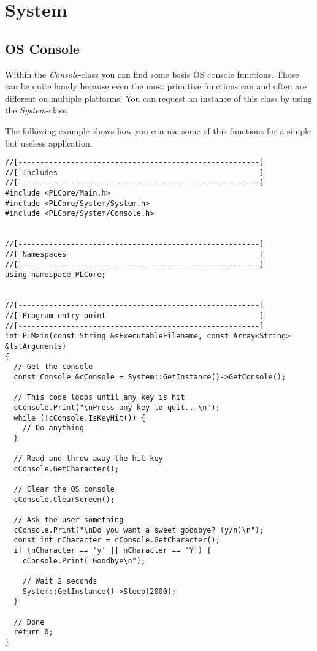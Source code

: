 \section{System}




\subsection{OS Console}
Within the \emph{Console}-class you can find some basis OS console functions. Those can be quite handy because even the most primitive functions can and often are different on multiple platforms! You can request an instance of this class by using the \emph{System}-class.

The following example shows how you can use some of this functions for a simple but useless application:

\begin{lstlisting}[caption=OS console usage example]
//[-------------------------------------------------------]
//[ Includes                                              ]
//[-------------------------------------------------------]
#include <PLCore/Main.h>
#include <PLCore/System/System.h>
#include <PLCore/System/Console.h>


//[-------------------------------------------------------]
//[ Namespaces                                            ]
//[-------------------------------------------------------]
using namespace PLCore;


//[-------------------------------------------------------]
//[ Program entry point                                   ]
//[-------------------------------------------------------]
int PLMain(const String &sExecutableFilename, const Array<String> &lstArguments)
{
  // Get the console
  const Console &cConsole = System::GetInstance()->GetConsole();

  // This code loops until any key is hit
  cConsole.Print("\nPress any key to quit...\n");
  while (!cConsole.IsKeyHit()) {
    // Do anything
  }

  // Read and throw away the hit key
  cConsole.GetCharacter();

  // Clear the OS console
  cConsole.ClearScreen();

  // Ask the user something
  cConsole.Print("\nDo you want a sweet goodbye? (y/n)\n");
  const int nCharacter = cConsole.GetCharacter();
  if (nCharacter == 'y' || nCharacter == 'Y') {
    cConsole.Print("Goodbye\n");

    // Wait 2 seconds
    System::GetInstance()->Sleep(2000);
  }

  // Done
  return 0;
}
\end{lstlisting}
